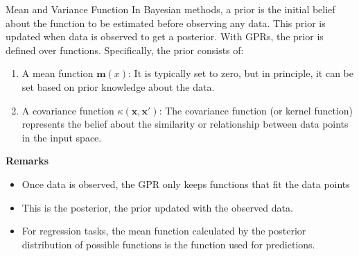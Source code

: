 \documentclass[10pt]{beamer}
\begin{document}
%	


\begin{frame}[fragile]{Mean and Variance Function}
	In Bayesian methods, a prior is the initial belief about the function to be estimated before observing any data. This prior is updated when data is observed to get a posterior. With GPRs, the prior is defined over functions. Specifically, the prior consists of:
	
	\begin{enumerate}
		\item A mean function $\mathbf{m}(x)$: It is typically set to zero, but in principle, it can be set based on prior knowledge about the data.
		\item A covariance function $\kappa(\mathbf{x}, \mathbf{x}′)$: The covariance function (or kernel function) represents the belief about the similarity or relationship between data points in the input space.
	\end{enumerate}
	\textbf{Remarks}
	\begin{itemize}
		\item Once data is observed, the GPR only keeps functions that fit the data points
		\item This is the posterior, the prior updated with the observed data.
		\item For regression tasks, the mean function calculated by the posterior distribution of possible functions is the function used for predictions.
		
	\end{itemize}
	
\end{frame}
\end{document}
